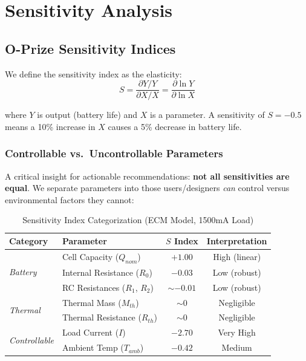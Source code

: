 \documentclass[12pt]{article}
\begin{document}
\section{Sensitivity Analysis}

\subsection{O-Prize Sensitivity Indices}

We define the sensitivity index as the elasticity:
\begin{equation}
    S = \frac{\partial Y / Y}{\partial X / X} = \frac{\partial \ln Y}{\partial \ln X}
\end{equation}

where $Y$ is output (battery life) and $X$ is a parameter. A sensitivity of $S = -0.5$ means a 10\% increase in $X$ causes a 5\% decrease in battery life.

\subsubsection{Controllable vs.\ Uncontrollable Parameters}

A critical insight for actionable recommendations: \textbf{not all sensitivities are equal}. We separate parameters into those users/designers \textit{can} control versus environmental factors they cannot:

\begin{table}[htbp]
\centering
\caption{Sensitivity Index Categorization (ECM Model, 1500mA Load)}
\label{tab:sensitivity_categories}
\begin{tabular}{llcc}
\toprule
\textbf{Category} & \textbf{Parameter} & \textbf{$S$ Index} & \textbf{Interpretation} \\
\midrule
\multirow{3}{*}{\textit{Battery}} & Cell Capacity ($Q_{nom}$) & $+1.00$ & High (linear) \\
 & Internal Resistance ($R_0$) & $-0.03$ & Low (robust) \\
 & RC Resistances ($R_1$, $R_2$) & $\sim -0.01$ & Low (robust) \\
\midrule
\multirow{2}{*}{\textit{Thermal}} & Thermal Mass ($M_{th}$) & $\sim 0$ & Negligible \\
 & Thermal Resistance ($R_{th}$) & $\sim 0$ & Negligible \\
\midrule
\multirow{2}{*}{\textit{Controllable}} & Load Current ($I$) & $-2.70$ & Very High \\
 & Ambient Temp ($T_{amb}$) & $-0.42$ & Medium \\
\bottomrule
\end{tabular}
\end{table}
\end{document}
